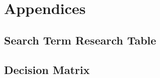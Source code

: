 
\chapter{Appendices}
\label{cha:appendices}

\section{Search Term Research Table}


\section{Decision Matrix}
\label{cha:decision_matrix}
%